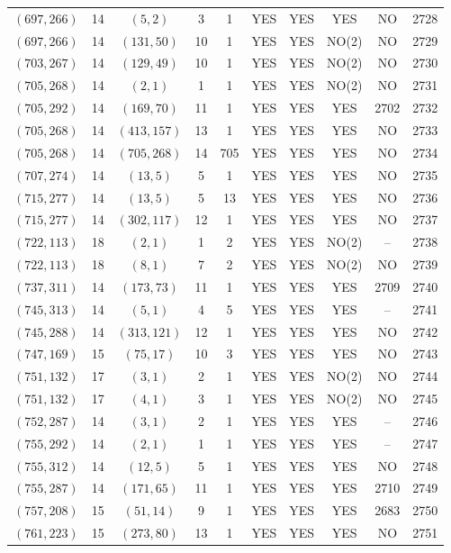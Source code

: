 \begin{longtable}{|c|c|c|c|c|c|c|c|c|c|}
$(697, 266)$ & 14 & $(5, 2)$ & 3 & 1 & YES & YES & YES & NO & 2728\\
$(697, 266)$ & 14 & $(131, 50)$ & 10 & 1 & YES & YES & NO(2) & NO & 2729\\
$(703, 267)$ & 14 & $(129, 49)$ & 10 & 1 & YES & YES & NO(2) & NO & 2730\\
$(705, 268)$ & 14 & $(2, 1)$ & 1 & 1 & YES & YES & NO(2) & NO & 2731\\
$(705, 292)$ & 14 & $(169, 70)$ & 11 & 1 & YES & YES & YES & 2702 & 2732\\
$(705, 268)$ & 14 & $(413, 157)$ & 13 & 1 & YES & YES & YES & NO & 2733\\
$(705, 268)$ & 14 & $(705, 268)$ & 14 & 705 & YES & YES & YES & NO & 2734\\
$(707, 274)$ & 14 & $(13, 5)$ & 5 & 1 & YES & YES & YES & NO & 2735\\
$(715, 277)$ & 14 & $(13, 5)$ & 5 & 13 & YES & YES & YES & NO & 2736\\
$(715, 277)$ & 14 & $(302, 117)$ & 12 & 1 & YES & YES & YES & NO & 2737\\
$(722, 113)$ & 18 & $(2, 1)$ & 1 & 2 & YES & YES & NO(2) & -- & 2738\\
$(722, 113)$ & 18 & $(8, 1)$ & 7 & 2 & YES & YES & NO(2) & NO & 2739\\
$(737, 311)$ & 14 & $(173, 73)$ & 11 & 1 & YES & YES & YES & 2709 & 2740\\
$(745, 313)$ & 14 & $(5, 1)$ & 4 & 5 & YES & YES & YES & -- & 2741\\
$(745, 288)$ & 14 & $(313, 121)$ & 12 & 1 & YES & YES & YES & NO & 2742\\
$(747, 169)$ & 15 & $(75, 17)$ & 10 & 3 & YES & YES & YES & NO & 2743\\
$(751, 132)$ & 17 & $(3, 1)$ & 2 & 1 & YES & YES & NO(2) & NO & 2744\\
$(751, 132)$ & 17 & $(4, 1)$ & 3 & 1 & YES & YES & NO(2) & NO & 2745\\
$(752, 287)$ & 14 & $(3, 1)$ & 2 & 1 & YES & YES & YES & -- & 2746\\
$(755, 292)$ & 14 & $(2, 1)$ & 1 & 1 & YES & YES & YES & -- & 2747\\
$(755, 312)$ & 14 & $(12, 5)$ & 5 & 1 & YES & YES & YES & NO & 2748\\
$(755, 287)$ & 14 & $(171, 65)$ & 11 & 1 & YES & YES & YES & 2710 & 2749\\
$(757, 208)$ & 15 & $(51, 14)$ & 9 & 1 & YES & YES & YES & 2683 & 2750\\
$(761, 223)$ & 15 & $(273, 80)$ & 13 & 1 & YES & YES & YES & NO & 2751\\

\end{longtable}
